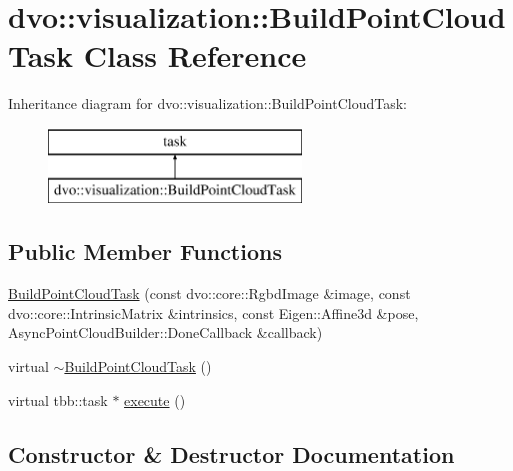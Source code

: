 \hypertarget{classdvo_1_1visualization_1_1_build_point_cloud_task}{}\section{dvo\+:\+:visualization\+:\+:Build\+Point\+Cloud\+Task Class Reference}
\label{classdvo_1_1visualization_1_1_build_point_cloud_task}
Inheritance diagram for dvo\+:\+:visualization\+:\+:Build\+Point\+Cloud\+Task\+:\begin{figure}[H]
\begin{center}
\leavevmode
\includegraphics[height=2.000000cm]{classdvo_1_1visualization_1_1_build_point_cloud_task}
\end{center}
\end{figure}
\subsection*{Public Member Functions}
\begin{DoxyCompactItemize}
\item 
\mbox{\hyperlink{classdvo_1_1visualization_1_1_build_point_cloud_task_a86d5efbdab6f61d69949d86291a568ee}{Build\+Point\+Cloud\+Task}} (const dvo\+::core\+::\+Rgbd\+Image \&image, const dvo\+::core\+::\+Intrinsic\+Matrix \&intrinsics, const Eigen\+::\+Affine3d \&pose, Async\+Point\+Cloud\+Builder\+::\+Done\+Callback \&callback)
\item 
virtual \mbox{\hyperlink{classdvo_1_1visualization_1_1_build_point_cloud_task_a36ec8829378677b87aca9dd3ef9c5a68}{$\sim$\+Build\+Point\+Cloud\+Task}} ()
\item 
virtual tbb\+::task $\ast$ \mbox{\hyperlink{classdvo_1_1visualization_1_1_build_point_cloud_task_aa9ee4ddd7a6ed4fda80328ed542b7f03}{execute}} ()
\end{DoxyCompactItemize}


\subsection{Constructor \& Destructor Documentation}
\mbox{\label{classdvo_1_1visualization_1_1_build_point_cloud_task_a86d5efbdab6f61d69949d86291a568ee}} 
